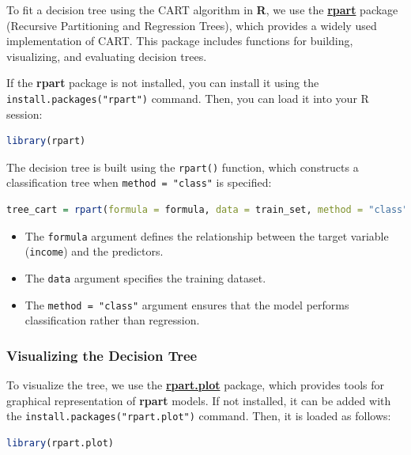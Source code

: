 \documentclass[
  11pt,
]{book}
\newcommand{\passthrough}[1]{#1}
\providecommand{\tightlist}{%
  \setlength{\itemsep}{0pt}\setlength{\parskip}{0pt}}
\theoremstyle{definition}
\theoremstyle{definition}
\theoremstyle{definition}
\theoremstyle{definition}
\theoremstyle{remark}
\begin{document}
To fit a decision tree using the CART algorithm in \textbf{R}, we use the \href{https://CRAN.R-project.org/package=rpart}{\textbf{rpart}} package (Recursive Partitioning and Regression Trees), which provides a widely used implementation of CART. This package includes functions for building, visualizing, and evaluating decision trees.

If the \textbf{rpart} package is not installed, you can install it using the \passthrough{\lstinline!install.packages("rpart")!} command. Then, you can load it into your R session:

\begin{lstlisting}[language=R]
library(rpart)
\end{lstlisting}

The decision tree is built using the \passthrough{\lstinline!rpart()!} function, which constructs a classification tree when \passthrough{\lstinline!method = "class"!} is specified:

\begin{lstlisting}[language=R]
tree_cart = rpart(formula = formula, data = train_set, method = "class")
\end{lstlisting}

\begin{itemize}
\tightlist
\item
  The \passthrough{\lstinline!formula!} argument defines the relationship between the target variable (\passthrough{\lstinline!income!}) and the predictors.
\item
  The \passthrough{\lstinline!data!} argument specifies the training dataset.
\item
  The \passthrough{\lstinline!method = "class"!} argument ensures that the model performs classification rather than regression.
\end{itemize}

\subsubsection*{Visualizing the Decision Tree}\label{visualizing-the-decision-tree}


To visualize the tree, we use the \href{https://CRAN.R-project.org/package=rpart.plot}{\textbf{rpart.plot}} package, which provides tools for graphical representation of \textbf{rpart} models. If not installed, it can be added with the \passthrough{\lstinline!install.packages("rpart.plot")!} command. Then, it is loaded as follows:

\begin{lstlisting}[language=R]
library(rpart.plot)
\end{lstlisting}
\end{document}
